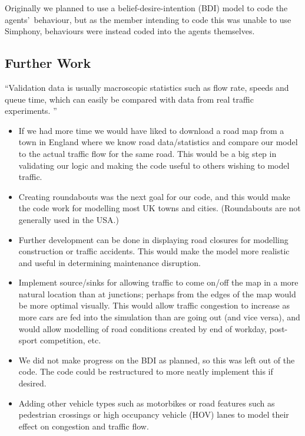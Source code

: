 \documentclass[11pt]{article}
\begin{document}
\begin{enumerate}
Originally we planned to use a belief-desire-intention (BDI) model to code the agents\textquoteright\ behaviour, but as the member intending to code this was unable to use Simphony, behaviours were instead coded into the agents themselves.
\\


\subsection{Further Work}

\textquotedblleft Validation data is usually macroscopic statistics such as flow rate, speeds and queue time, which can easily be compared with data from real traffic experiments. \textquotedblright \cite{4d} 

\begin{itemize}\itemsep0pt
\item If we had more time we would have liked to download a road map from a town in England where we know road data/statistics and compare our model to the actual traffic flow for the same road. This would be a big step in validating our logic and making the code useful to others wishing to model traffic.

\item Creating roundabouts was the next goal for our code, and this would make the code work for modelling most UK towns and cities. (Roundabouts are not generally used in the USA.)

\item Further development can be done in displaying road closures for modelling construction or traffic accidents. This would make the model more realistic and useful in determining maintenance disruption.

\item Implement source/sinks for allowing traffic to come on/off the map in a more natural location than at junctions; perhaps from the edges of the map would be more optimal visually. This would allow traffic congestion to increase as more cars are fed into the simulation than are going out (and vice versa), and would allow modelling of road conditions created by end of workday, post-sport competition, etc. 

\item We did not make progress on the BDI as planned, so this was left out of the code. The code could be restructured to more neatly implement this if desired.

\item Adding other vehicle types such as motorbikes or road features such as pedestrian crossings or high occupancy vehicle (HOV) lanes to model their effect on congestion and traffic flow.
\end{itemize}



\end{enumerate}
\end{document}
